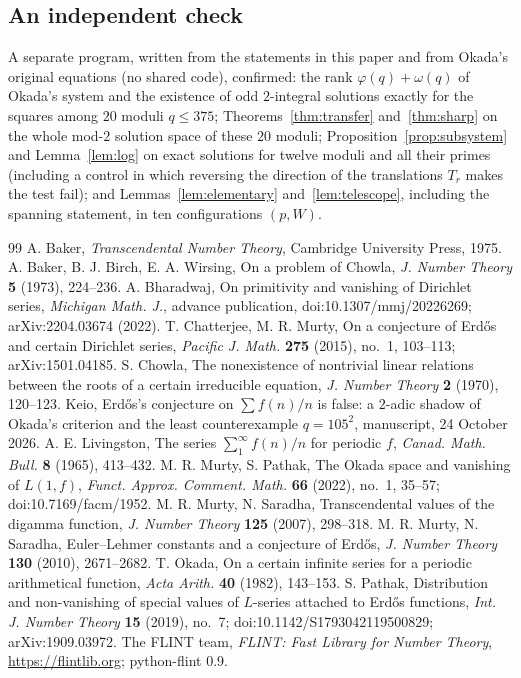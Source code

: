 \documentclass[11pt]{amsart}
\theoremstyle{definition}
\theoremstyle{remark}
\numberwithin{equation}{section}
\begin{document}
\subsection{An independent check}
A separate program, written from the statements in this paper and from Okada's original equations \cite{Oka82} (no shared code), confirmed: the rank $\varphi(q)+\omega(q)$ of Okada's system and the existence of odd $2$-integral solutions exactly for the squares among $20$ moduli $q\le375$; Theorems~\ref{thm:transfer} and~\ref{thm:sharp} on the whole mod-$2$ solution space of these $20$ moduli; Proposition~\ref{prop:subsystem} and Lemma~\ref{lem:log} on exact solutions for twelve moduli and all their primes (including a control in which reversing the direction of the translations $T_r$ makes the test fail); and Lemmas~\ref{lem:elementary} and~\ref{lem:telescope}, including the spanning statement, in ten configurations $(p,W)$.
\begin{thebibliography}{99}
 A. Baker, \emph{Transcendental Number Theory}, Cambridge University Press, 1975.
 A. Baker, B. J. Birch, E. A. Wirsing, On a problem of Chowla, \emph{J. Number Theory} \textbf{5} (1973), 224--236.
 A. Bharadwaj, On primitivity and vanishing of Dirichlet series, \emph{Michigan Math. J.}, advance publication, doi:10.1307/mmj/20226269; arXiv:2204.03674 (2022).
 T. Chatterjee, M. R. Murty, On a conjecture of Erd\H{o}s and certain Dirichlet series, \emph{Pacific J. Math.} \textbf{275} (2015), no.~1, 103--113; arXiv:1501.04185.
 S. Chowla, The nonexistence of nontrivial linear relations between the roots of a certain irreducible equation, \emph{J. Number Theory} \textbf{2} (1970), 120--123.
 Keio, Erd\H{o}s's conjecture on $\sum f(n)/n$ is false: a $2$-adic shadow of Okada's criterion and the least counterexample $q=105^2$, manuscript, 24 October 2026.
 A. E. Livingston, The series $\sum_1^\infty f(n)/n$ for periodic $f$, \emph{Canad. Math. Bull.} \textbf{8} (1965), 413--432.
 M. R. Murty, S. Pathak, The Okada space and vanishing of $L(1,f)$, \emph{Funct. Approx. Comment. Math.} \textbf{66} (2022), no.~1, 35--57; doi:10.7169/facm/1952.
 M. R. Murty, N. Saradha, Transcendental values of the digamma function, \emph{J. Number Theory} \textbf{125} (2007), 298--318.
 M. R. Murty, N. Saradha, Euler--Lehmer constants and a conjecture of Erd\H{o}s, \emph{J. Number Theory} \textbf{130} (2010), 2671--2682.
 T. Okada, On a certain infinite series for a periodic arithmetical function, \emph{Acta Arith.} \textbf{40} (1982), 143--153.
 S. Pathak, Distribution and non-vanishing of special values of $L$-series attached to Erd\H{o}s functions, \emph{Int. J. Number Theory} \textbf{15} (2019), no.~7; doi:10.1142/S1793042119500829; arXiv:1909.03972.
 The FLINT team, \emph{FLINT: Fast Library for Number Theory}, \url{https://flintlib.org}; python-flint 0.9.
\end{thebibliography}
\end{document}
